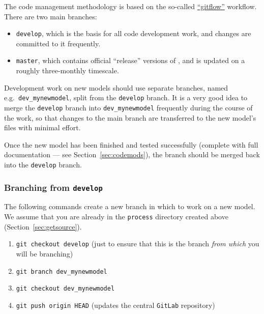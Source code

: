 The code management methodology is based on the so-called
\href{https://www.atlassian.com/git/workflows#!workflow-gitflow}{``gitflow''}
workflow. There are two main branches:
\begin{itemize}

\item \texttt{develop}, which is the basis for all code development work, and
  changes are committed to it frequently.

\item \texttt{master}, which contains official ``release'' versions of
  \process, and is updated on a roughly three-monthly timescale.

\end{itemize}

Development work on new models should use separate branches, named e.g.\
\texttt{dev\_mynewmodel}, split from the \texttt{develop} branch. It is a very
good idea to merge the \texttt{develop} branch into \texttt{dev\_mynewmodel}
frequently during the course of the work, so that changes to the main branch
are transferred to the new model's files with minimal effort.

Once the new model has been finished and tested successfully (complete with full
documentation --- see Section~\ref{sec:codemods}), the branch should be merged
back into the \texttt{develop} branch.

\subsubsection{Branching from \texttt{develop}}

The following commands create a new branch in which to work on a new model. We
assume that you are already in the \texttt{process} directory created above
(Section~\ref{sec:getsource}).
\begin{enumerate}

\item \texttt{git checkout develop} (just to ensure that this is the branch
  \textit{from which}\/ you will be branching)

\item \texttt{git branch dev\_mynewmodel}

\item \texttt{git checkout dev\_mynewmodel}

\item \texttt{git push origin HEAD}  (updates the central \texttt{GitLab} repository)

\end{enumerate}

